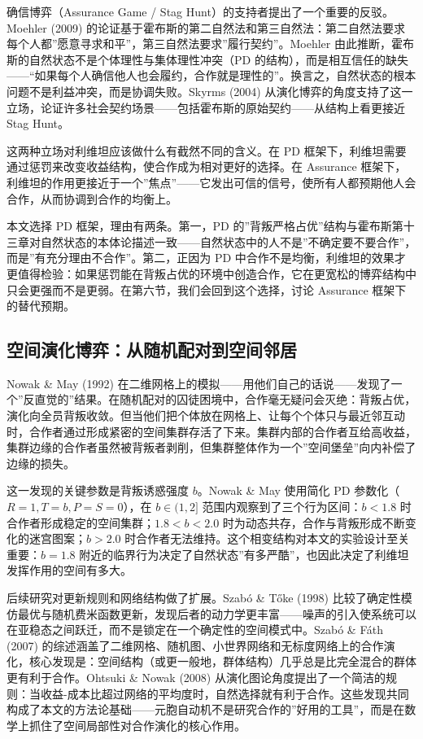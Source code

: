 \documentclass[12pt,a4paper]{ctexart}
\begin{document}
确信博弈（Assurance Game / Stag Hunt）的支持者提出了一个重要的反驳。Moehler (2009) 的论证基于霍布斯的第二自然法和第三自然法：第二自然法要求每个人都”愿意寻求和平”，第三自然法要求”履行契约”。Moehler 由此推断，霍布斯的自然状态不是个体理性与集体理性冲突（PD 的结构），而是相互信任的缺失——“如果每个人确信他人也会履约，合作就是理性的”。换言之，自然状态的根本问题不是利益冲突，而是协调失败。Skyrms (2004) 从演化博弈的角度支持了这一立场，论证许多社会契约场景——包括霍布斯的原始契约——从结构上看更接近 Stag Hunt。

这两种立场对利维坦应该做什么有截然不同的含义。在 PD 框架下，利维坦需要通过惩罚来改变收益结构，使合作成为相对更好的选择。在 Assurance 框架下，利维坦的作用更接近于一个”焦点”——它发出可信的信号，使所有人都预期他人会合作，从而协调到合作的均衡上。

本文选择 PD 框架，理由有两条。第一，PD 的”背叛严格占优”结构与霍布斯第十三章对自然状态的本体论描述一致——自然状态中的人不是”不确定要不要合作”，而是”有充分理由不合作”。第二，正因为 PD 中合作不是均衡，利维坦的效果才更值得检验：如果惩罚能在背叛占优的环境中创造合作，它在更宽松的博弈结构中只会更强而不是更弱。在第六节，我们会回到这个选择，讨论 Assurance 框架下的替代预期。

\subsection{空间演化博弈：从随机配对到空间邻居}

Nowak \& May (1992) 在二维网格上的模拟——用他们自己的话说——发现了一个”反直觉的”结果。在随机配对的囚徒困境中，合作毫无疑问会灭绝：背叛占优，演化向全员背叛收敛。但当他们把个体放在网格上、让每个个体只与最近邻互动时，合作者通过形成紧密的空间集群存活了下来。集群内部的合作者互给高收益，集群边缘的合作者虽然被背叛者剥削，但集群整体作为一个”空间堡垒”向内补偿了边缘的损失。

这一发现的关键参数是背叛诱惑强度 $b$。Nowak \& May 使用简化 PD 参数化（$R=1, T=b, P=S=0$），在 $b \in (1, 2]$ 范围内观察到了三个行为区间：$b < 1.8$ 时合作者形成稳定的空间集群；$1.8 < b < 2.0$ 时为动态共存，合作与背叛形成不断变化的迷宫图案；$b > 2.0$ 时合作者无法维持。这个相变结构对本文的实验设计至关重要：$b=1.8$ 附近的临界行为决定了自然状态”有多严酷”，也因此决定了利维坦发挥作用的空间有多大。

后续研究对更新规则和网络结构做了扩展。Szab\'{o} \& T\H{o}ke (1998) 比较了确定性模仿最优与随机费米函数更新，发现后者的动力学更丰富——噪声的引入使系统可以在亚稳态之间跃迁，而不是锁定在一个确定性的空间模式中。Szab\'{o} \& F\'{a}th (2007) 的综述涵盖了二维网格、随机图、小世界网络和无标度网络上的合作演化，核心发现是：空间结构（或更一般地，群体结构）几乎总是比完全混合的群体更有利于合作。Ohtsuki \& Nowak (2008) 从演化图论角度提出了一个简洁的规则：当收益-成本比超过网络的平均度时，自然选择就有利于合作。这些发现共同构成了本文的方法论基础——元胞自动机不是研究合作的”好用的工具”，而是在数学上抓住了空间局部性对合作演化的核心作用。
\end{document}
